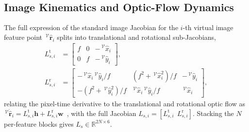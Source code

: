 \documentclass[10pt,journal]{IEEEtran}
\begin{document}
\subsection{Image Kinematics and Optic-Flow Dynamics}
\label{sup:optic_flow_dynamics}
The full expression of the standard image Jacobian for the $i$-th virtual image feature point $\,^\mathcal{V}\hat{\boldsymbol{r}}_i$ splits into translational and rotational sub-Jacobians,
\begin{align} \label{sup:interaction matrix}
L_{s,i}^\text{t} &= \begin{bmatrix} f & 0 & -\,^\mathcal{V}\hat{x}_i \\ 0 & f & -\,^\mathcal{V}\hat{y}_i \end{bmatrix},\nonumber\\
L_{s,i}^\text{r} &= \begin{bmatrix} -\,^\mathcal{V}\hat{x}_i\,^\mathcal{V}\hat{y}_i/f & (f^2+\,^\mathcal{V}\hat{x}_i^2)/f & -\,^\mathcal{V}\hat{y}_i \\ -(f^2+\,^\mathcal{V}\hat{y}_i^2)/f & \,^\mathcal{V}\hat{x}_i\,^\mathcal{V}\hat{y}_i/f & \,^\mathcal{V}\hat{x}_i \end{bmatrix},
\end{align}
relating the pixel-time derivative to the translational and rotational optic flow as $\,^\mathcal{V}\dot{\hat{\boldsymbol{r}}}_i = L_{s,i}^\text{t}\boldsymbol{h} + L_{s,i}^\text{r}\boldsymbol{w}$~\cite{chaumette2006}, with the full Jacobian $L_{s,i}=[L_{s,i}^\text{t}~~L_{s,i}^\text{r}]$. Stacking the $N$ per-feature blocks gives $L_s\in\mathbb{R}^{2N\times 6}$.
\end{document}
